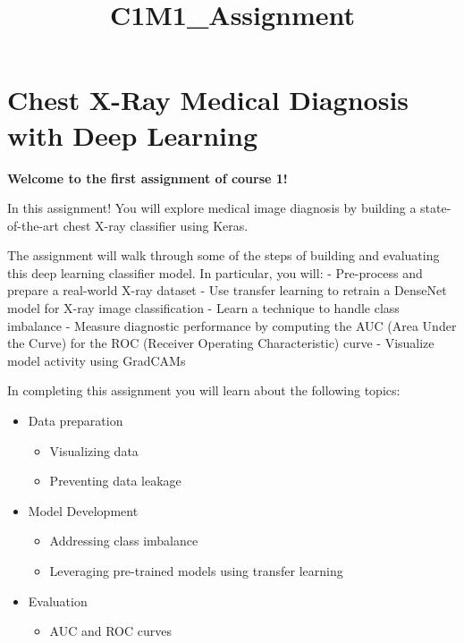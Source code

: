 \documentclass[11pt]{article}
\title{C1M1\_Assignment}
\providecommand{\tightlist}{%
      \setlength{\itemsep}{0pt}\setlength{\parskip}{0pt}}
\begin{document}
    
    
    \maketitle
    
    

    
    \hypertarget{chest-x-ray-medical-diagnosis-with-deep-learning}{%
\section{Chest X-Ray Medical Diagnosis with Deep
Learning}\label{chest-x-ray-medical-diagnosis-with-deep-learning}}

    \textbf{Welcome to the first assignment of course 1!}

In this assignment! You will explore medical image diagnosis by building
a state-of-the-art chest X-ray classifier using Keras.

The assignment will walk through some of the steps of building and
evaluating this deep learning classifier model. In particular, you will:
- Pre-process and prepare a real-world X-ray dataset - Use transfer
learning to retrain a DenseNet model for X-ray image classification -
Learn a technique to handle class imbalance - Measure diagnostic
performance by computing the AUC (Area Under the Curve) for the ROC
(Receiver Operating Characteristic) curve - Visualize model activity
using GradCAMs

In completing this assignment you will learn about the following topics:

\begin{itemize}
\tightlist
\item
  Data preparation

  \begin{itemize}
  \tightlist
  \item
    Visualizing data
  \item
    Preventing data leakage
  \end{itemize}
\item
  Model Development

  \begin{itemize}
  \tightlist
  \item
    Addressing class imbalance
  \item
    Leveraging pre-trained models using transfer learning
  \end{itemize}
\item
  Evaluation

  \begin{itemize}
  \tightlist
  \item
    AUC and ROC curves
  \end{itemize}
\end{itemize}
\end{document}
